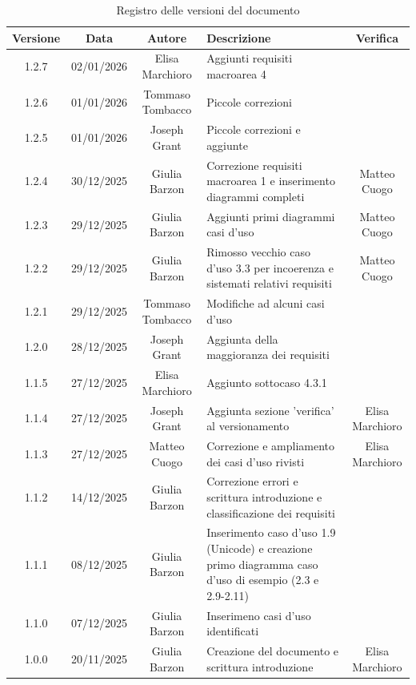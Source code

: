 \documentclass[11pt,a4paper]{article}
\begin{document}
\begin{table}[H]
    \centering
    \begin{tabular}{|c|c|c|>{\raggedright\arraybackslash}p{}|c|}
        \hline
        \textbf{Versione} & \textbf{Data} & \textbf{Autore} & \textbf{Descrizione} & \textbf{Verifica} \\
        \hline
        1.2.7 & 02/01/2026 & Elisa Marchioro & Aggiunti requisiti macroarea 4 &  \\
        \hline
        1.2.6 & 01/01/2026 & Tommaso Tombacco & Piccole correzioni &  \\
        \hline
        1.2.5 & 01/01/2026 & Joseph Grant & Piccole correzioni e aggiunte &  \\
        \hline
        1.2.4 & 30/12/2025 & Giulia Barzon & Correzione requisiti macroarea 1 e inserimento diagrammi completi & Matteo Cuogo \\
        \hline
        1.2.3 & 29/12/2025 & Giulia Barzon & Aggiunti primi diagrammi casi d'uso &  Matteo Cuogo \\
        \hline
        1.2.2 & 29/12/2025 & Giulia Barzon & Rimosso vecchio caso d'uso 3.3 per incoerenza e sistemati relativi requisiti & Matteo Cuogo \\
        \hline
        1.2.1 & 29/12/2025 & Tommaso Tombacco & Modifiche ad alcuni casi d'uso &  \\ 
        \hline
        1.2.0 & 28/12/2025 & Joseph Grant & Aggiunta della maggioranza dei requisiti &  \\ 
        \hline
        1.1.5 & 27/12/2025 & Elisa Marchioro & Aggiunto sottocaso 4.3.1 & \\ 
        \hline
        1.1.4 & 27/12/2025 & Joseph Grant & Aggiunta sezione 'verifica' al versionamento & Elisa Marchioro\\ 
        \hline
        1.1.3 & 27/12/2025 & Matteo Cuogo & Correzione e ampliamento dei casi d'uso rivisti & Elisa Marchioro\\
        \hline
        1.1.2 & 14/12/2025 & Giulia Barzon & Correzione errori e scrittura introduzione e classificazione dei requisiti &\\
        \hline
        1.1.1 & 08/12/2025 & Giulia Barzon & Inserimento caso d'uso 1.9 (Unicode) e creazione primo diagramma caso d'uso di esempio (2.3 e 2.9-2.11) &\\
        \hline
        1.1.0 & 07/12/2025 & Giulia Barzon & Inserimeno casi d'uso identificati & \\
        \hline
        1.0.0 & 20/11/2025 & Giulia Barzon & Creazione del documento e scrittura introduzione & Elisa Marchioro\\
        \hline
    \end{tabular}
    \caption{Registro delle versioni del documento}
    \label{tab:versionamento}
\end{table}
\end{document}

